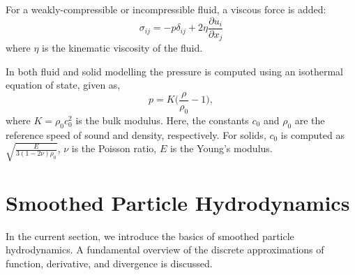 For a weakly-compressible or incompressible fluid, a viscous force is added:
\begin{equation}
  \label{eq:fluid-stress-decomposition}
  \sigma_{ij} = - p \delta_{ij} + 2 \eta \frac{\partial u_i}{\partial x_j}
\end{equation}
where $\eta$ is the kinematic viscosity of the fluid.

In both fluid and solid modelling the pressure is computed using an
isothermal equation of state, given as,
\begin{equation}
  \label{eq:pressure-equation}
  p = K \bigg(\frac{\rho}{\rho_{0}} - 1 \bigg),
\end{equation}
where $K = \rho_{0} c_0^2$ is the bulk modulus. Here, the constants $c_0$ and
$\rho_0$ are the reference speed of sound and density, respectively. For solids,
$c_0$ is computed as $\sqrt{\frac{E}{3 (1 - 2 \nu)\rho_{0}}}$, $\nu$ is the
Poisson ratio, $E$ is the Young's modulus.


\section{Smoothed Particle Hydrodynamics}
In the current section, we introduce the basics of smoothed particle
hydrodynamics. A fundamental overview of the discrete approximations of
function, derivative, and divergence is discussed.

